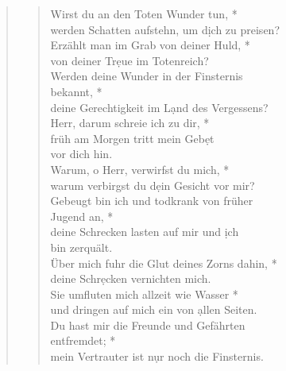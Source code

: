 \begin{quote}
\begin{verse}
 Wirst du an den Toten Wunder tun, *\\
 werden Schatten aufstehn, um d\d ich zu preisen? \\ 
\vin Erzählt man im Grab von deiner Huld, *\\
\vin von deiner Tr\d eue im Totenreich?\\
 Werden deine Wunder in der Finsternis \\  bekannt, *\\
 deine Gerechtigkeit im L\d and des Vergessens?\\
\vin Herr, darum schreie ich zu dir, *\\
\vin früh am Morgen tritt mein Geb\d et \\ \vin vor dich hin.\\ 
 Warum, o Herr, verwirfst du mich, *\\
 warum verbirgst du d\d ein Gesicht vor mir? \\
\vin Gebeugt bin ich und todkrank von früher\\ \vin  Jugend an, *\\
\vin deine Schrecken lasten auf mir und \d ich \\ \vin  bin zerquält.\\ 
 Über mich fuhr die Glut deines Zorns dahin, *\\
 deine Schr\d ecken vernichten mich.\\
\vin Sie umfluten mich allzeit wie Wasser *\\
\vin und dringen auf mich ein von \d allen Seiten.\\ 
 Du hast mir die Freunde und Gefährten\\ entfremdet; *\\
mein Vertrauter ist n\d ur noch die Finsternis.\\ 

\end{verse}

\end{quote}

\vspace{0.3cm}

\def\greinitialformat#1{{\fontsize{40}{40}\selectfont #1}}
\gresetfirstlineaboveinitial{\small \textcolor{red}{Ier 31}}{}
\setaboveinitialseparation{0.72mm}


